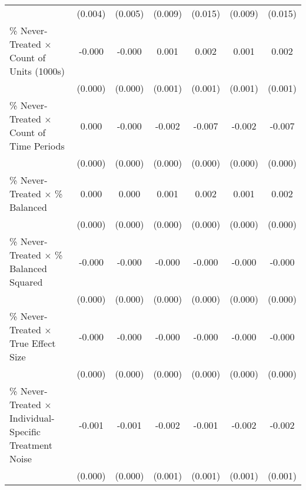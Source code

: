 \begin{table}[htbp]
{\begin{tabular}{p{4.5in}|*{6}{c}}
                    &     (0.004)         &     (0.005)         &     (0.009)         &     (0.015)         &     (0.009)         &     (0.015)         \\
\% Never-Treated $\times$ Count of Units (1000s)&      -0.000         &      -0.000         &       0.001         &       0.002         &       0.001         &       0.002         \\
                    &     (0.000)         &     (0.000)         &     (0.001)         &     (0.001)         &     (0.001)         &     (0.001)         \\
\% Never-Treated $\times$ Count of Time Periods&       0.000         &      -0.000         &      -0.002\sym{***}&      -0.007\sym{***}&      -0.002\sym{***}&      -0.007\sym{***}\\
                    &     (0.000)         &     (0.000)         &     (0.000)         &     (0.000)         &     (0.000)         &     (0.000)         \\
\% Never-Treated $\times$ \% Balanced&       0.000\sym{***}&       0.000\sym{***}&       0.001\sym{***}&       0.002\sym{***}&       0.001\sym{***}&       0.002\sym{***}\\
                    &     (0.000)         &     (0.000)         &     (0.000)         &     (0.000)         &     (0.000)         &     (0.000)         \\
\% Never-Treated $\times$ \% Balanced Squared&      -0.000\sym{***}&      -0.000\sym{***}&      -0.000\sym{***}&      -0.000\sym{***}&      -0.000\sym{***}&      -0.000\sym{***}\\
                    &     (0.000)         &     (0.000)         &     (0.000)         &     (0.000)         &     (0.000)         &     (0.000)         \\
\% Never-Treated $\times$ True Effect Size&      -0.000         &      -0.000         &      -0.000         &      -0.000\sym{*}  &      -0.000         &      -0.000\sym{*}  \\
                    &     (0.000)         &     (0.000)         &     (0.000)         &     (0.000)         &     (0.000)         &     (0.000)         \\
\% Never-Treated $\times$ Individual-Specific Treatment Noise&      -0.001\sym{*}  &      -0.001\sym{*}  &      -0.002\sym{*}  &      -0.001         &      -0.002\sym{*}  &      -0.002         \\
                    &     (0.000)         &     (0.000)         &     (0.001)         &     (0.001)         &     (0.001)         &     (0.001)         \\

\end{tabular}}
\end{table}
